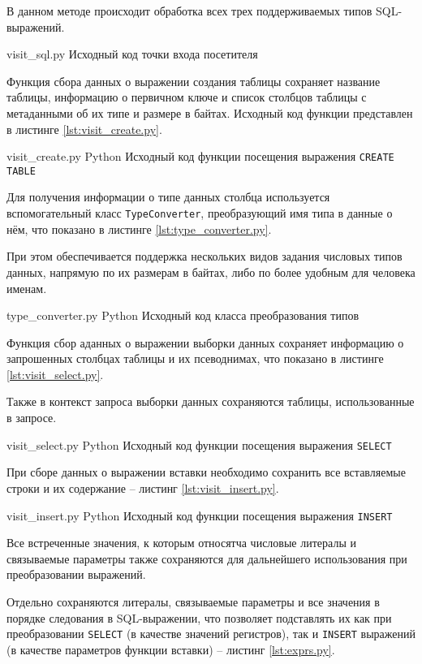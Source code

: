 В данном методе происходит обработка всех трех поддерживаемых типов SQL-выражений.

{visit_sql.py}
{Исходный код точки входа посетителя}

Функция сбора данных о выражении создания таблицы сохраняет название таблицы, информацию о первичном ключе и список столбцов таблицы с метаданными об их типе и размере в байтах.
Исходный код функции представлен в листинге \ref{lst:visit_create.py}.

{visit_create.py}
{Python}
{Исходный код функции посещения выражения \texttt{CREATE TABLE}}

Для получения информации о типе данных столбца используется вспомогательный класс \texttt{TypeConverter}, преобразующий имя типа в данные о нём, что показано в листинге \ref{lst:type_converter.py}.

При этом обеспечивается поддержка нескольких видов задания числовых типов данных, напрямую по их размерам в байтах, либо по более удобным для человека именам.

{type_converter.py}
{Python}
{Исходный код класса преобразования типов}

Функция сбор аданных о выражении выборки данных сохраняет информацию о запрошенных столбцах таблицы и их псеводнимах, что показано в листинге \ref{lst:visit_select.py}.

Также в контекст запроса выборки данных сохраняются таблицы, использованные в запросе.

{visit_select.py}
{Python}
{Исходный код функции посещения выражения \texttt{SELECT}}

При сборе данных о выражении вставки необходимо сохранить все вставляемые строки и их содержание -- листинг \ref{lst:visit_insert.py}.

{visit_insert.py}
{Python}
{Исходный код функции посещения выражения \texttt{INSERT}}

Все встреченные значения, к которым относятча числовые литералы и связываемые параметры также сохраняются для дальнейшего использования при преобразовании выражений.

Отдельно сохраняются литералы, связываемые параметры и все значения в порядке следования в SQL-выражении, что позволяет подставлять их как при преобразовании \texttt{SELECT} (в качестве значений регистров), так и \texttt{INSERT} выражений (в качестве параметров функции вставки) -- листинг \ref{lst:exprs.py}.

